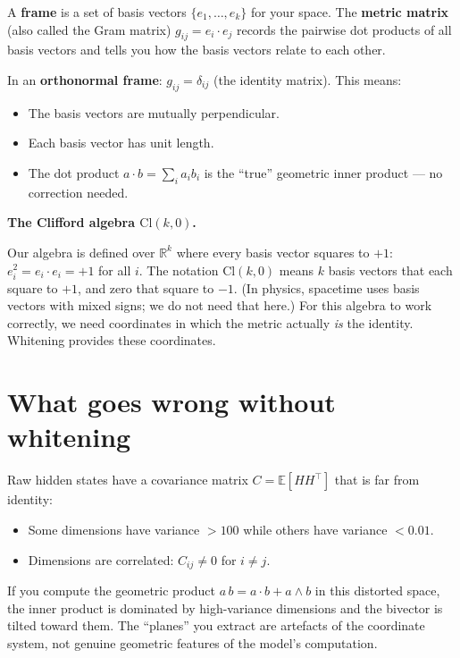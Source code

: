 \documentclass[11pt, twoside, openright]{memoir}
\newcommand{\gp}{\,}              %
\newcommand{\ip}{\cdot}           %
\newcommand{\op}{\wedge}          %
\begin{document}
A \textbf{frame} is a set of basis vectors $\{e_1, \ldots, e_k\}$ for
your space.  The \textbf{metric matrix} (also called the Gram matrix) $g_{ij} = e_i \ip e_j$ records the pairwise dot products of all basis vectors and tells
you how the basis vectors relate to each other.

In an \textbf{orthonormal frame}: $g_{ij} = \delta_{ij}$ (the identity
matrix).  This means:
\begin{itemize}[nosep]
\item The basis vectors are mutually perpendicular.
\item Each basis vector has unit length.
\item The dot product $a \ip b = \sum_i a_i b_i$ is the ``true''
  geometric inner product --- no correction needed.
\end{itemize}

\begin{gabox}
\textbf{The Clifford algebra $\mathrm{Cl}(k, 0)$.}

Our algebra is defined over $\mathbb{R}^k$ where every basis vector
squares to $+1$: $e_i^2 = e_i \ip e_i = +1$ for all $i$.  The notation
$\mathrm{Cl}(k, 0)$ means $k$ basis vectors that each square to $+1$,
and zero that square to $-1$.  (In physics, spacetime uses basis vectors
with mixed signs; we do not need that here.)  For this algebra to work
correctly, we need coordinates in which the metric actually \emph{is}
the identity.  Whitening provides these coordinates.
\end{gabox}

\section{What goes wrong without whitening}

Raw hidden states have a covariance matrix $C = \mathbb{E}[HH^\top]$
that is far from identity:
\begin{itemize}[nosep]
\item Some dimensions have variance $>100$ while others have variance
  $<0.01$.
\item Dimensions are correlated: $C_{ij} \neq 0$ for $i \neq j$.
\end{itemize}

If you compute the geometric product $a \gp b = a \ip b + a \op b$ in
this distorted space, the inner product is dominated by high-variance
dimensions and the bivector is tilted toward them.  The ``planes'' you
extract are artefacts of the coordinate system, not genuine geometric
features of the model's computation.
\end{document}
